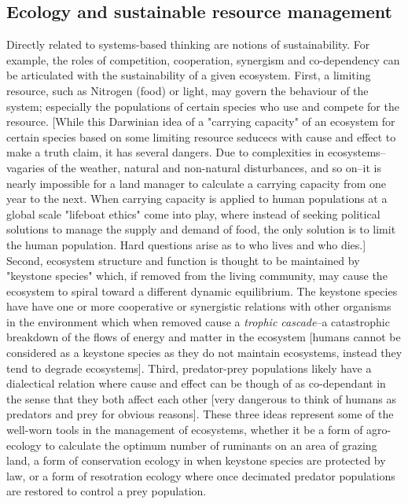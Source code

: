 \subsection{Ecology and sustainable resource management}
Directly related to systems-based thinking are notions of sustainability. For example, the roles of competition, cooperation, synergism and co-dependency can be articulated with the sustainability of a given ecosystem. First, a limiting resource, such as Nitrogen (food) or light, may govern the behaviour of the system; especially the populations of certain species who use and compete for the resource. [While this Darwinian idea of a "carrying capacity" of an ecosystem for certain species based on some limiting resource seducecs with cause and effect to make a truth claim, it has several dangers. Due to complexities in ecosystems--vagaries of the weather, natural and non-natural disturbances, and so on--it is nearly impossible for a land manager to calculate a carrying capacity from one year to the next. When carrying capacity is applied to human populations at a global scale "lifeboat ethics" come into play, where instead of seeking political solutions to manage the supply and demand of food, the only solution is to limit the human population. Hard questions arise as to who lives and who dies.] Second, ecosystem structure and function is thought to be maintained by "keystone species" which, if removed from the living community, may cause the ecosystem to spiral toward a different dynamic equilibrium. The keystone species have have one or more cooperative or synergistic relations with other organisms in the environment which when removed cause a \textit{trophic cascade}--a catastrophic breakdown of the flows of energy and matter in the ecosystem [humans cannot be considered as a keystone species as they do not maintain ecosystems, instead they tend to degrade ecosystems]. Third, predator-prey populations likely have a dialectical relation where cause and effect can be though of as co-dependant in the sense that they both affect each other [very dangerous to think of humans as predators and prey for obvious reasons]. These three ideas represent some of the well-worn tools in the management of ecosystems, whether it be a form of agro-ecology to calculate the optimum number of ruminants on an area of grazing land, a form of conservation ecology in when keystone species are protected by law, or a form of resotration ecology where once decimated predator populations are restored to control a prey population. 

